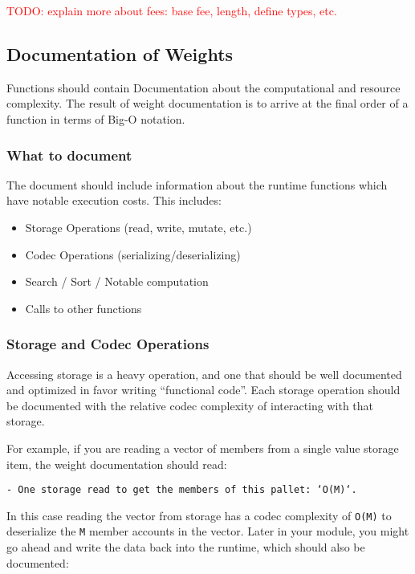 \documentclass[11pt,a4paper]{article}
\newcommand{\todo}[1]{\textcolor{red}{TODO: #1}}
\begin{document}
\todo{explain more about fees: base fee, length, define types, etc.}

\subsection{Documentation of Weights}
Functions should contain Documentation about the computational and resource complexity.
The result of weight documentation is to arrive at the final order of a function
in terms of Big-O notation.

\subsubsection{What to document}
The document should include information about the runtime functions which have notable
execution costs. This includes:

\begin{itemize}
\item Storage Operations (read, write, mutate, etc.)
\item Codec Operations (serializing/deserializing)
\item Search / Sort / Notable computation
\item Calls to other functions
\end{itemize}

\subsubsection{Storage and Codec Operations}
Accessing storage is a heavy operation, and one that should be well documented and
optimized in favor writing “functional code”. Each storage operation should be
documented with the relative codec complexity of interacting with that storage.
\newline

For example, if you are reading a vector of members from a single value storage
item, the weight documentation should read:
\newline

\texttt{- One storage read to get the members of this pallet: `O(M)`.}
\newline

In this case reading the vector from storage has a codec complexity of \texttt{O(M)}
to deserialize the \texttt{M} member accounts in the vector. Later in your module,
you might go ahead and write the data back into the runtime, which should also be
documented:
\newline
\end{document}

